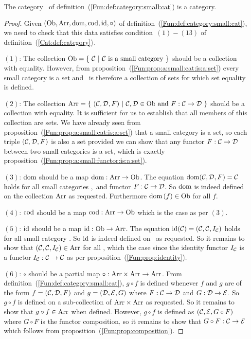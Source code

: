\begin{prop}\label{Fun:prop:category:small:cat}
    The category \cat\ of definition~(\ref{Fun:def:category:small:cat}) is 
    a category.
\end{prop}
\begin{proof}
    Given $(\mbox{\rm Ob}, \mbox{\rm Arr}, \mbox{\rm dom}, \mbox{\rm cod}, \mbox{\rm id}, \circ)$ of
    definition~(\ref{Fun:def:category:small:cat}), we need to check that this
    data satisfies condition~$(1)-(13)$ of definition~(\ref{Cat:def:category}).

    $(1)$: The collection $\ob=\{\ \Cat\ |\ \mbox{\Cat\ is a small category}\ \}$
    should be a collection with equality. However, from
    proposition~(\ref{Fun:prop:a:small:cat:is:a:set}) every small category is 
    a set and \ob\ is therefore a collection of sets for which set equality 
    is defined.
    
    $(2)$: The collection $\arr =\{\ (\Cat,\Dat,F)\ |\ \Cat,\Dat\in\ob\  
    \mbox{and}\ F:\Cat\to\Dat\ \}$ should be a collection with equality.
    It is sufficient for us to establish that all members of this collection
    are sets. We have already seen from 
    proposition~(\ref{Fun:prop:a:small:cat:is:a:set}) that a small category 
    is a set, so each triple $(\mbox{$\cal C$},\mbox{$\cal D$},F)$ is also a set provided we can 
    show that any functor $F:\mbox{$\cal C$}\to\mbox{$\cal D$}$ between two small categories is a 
    set, which is exactly proposition~(\ref{Fun:prop:a:small:functor:is:a:set}).
    
    $(3)$: $\mbox{\rm dom}$ should be a map $\mbox{\rm dom}:\mbox{\rm Arr}\to\mbox{\rm Ob}$. The equation
    $\mbox{\rm dom}(\mbox{$\cal C$},\mbox{$\cal D$},F)=\mbox{$\cal C$}$ holds for all small categories \Cat,\Dat\ and 
    functor $F:\mbox{$\cal C$}\to\mbox{$\cal D$}$. So $\mbox{\rm dom}$ is indeed defined on the collection
    $\mbox{\rm Arr}$ as requested. Furthermore $\mbox{\rm dom}\,(f)\in\mbox{\rm Ob}$ for all $f$.

    $(4)$: $\mbox{\rm cod}$ should be a map $\mbox{\rm cod}:\mbox{\rm Arr}\to\mbox{\rm Ob}$ which is the case 
    as per $(3)$.

    $(5)$: $\mbox{\rm id}$ should be a map $\mbox{\rm id}:\mbox{\rm Ob}\to\mbox{\rm Arr}$. The equation $\mbox{\rm id}(\mbox{$\cal C$})
    =(\mbox{$\cal C$},\mbox{$\cal C$},I_{\cal C})$ holds for all small category \Cat. So $\mbox{\rm id}$
    is indeed defined on \ob\ as requested. So it remains to show that
    $(\mbox{$\cal C$},\mbox{$\cal C$},I_{\cal C})\in\mbox{\rm Arr}$ for all \Cat, which the case since
    the identity functor $I_{\cal C}$ is a functor $I_{\cal C}:\mbox{$\cal C$}\to\mbox{$\cal C$}$ as 
    per proposition~(\ref{Fun:prop:identity}).

    $(6)$: $\circ$ should be a partial map $\circ:\mbox{\rm Arr}\times\mbox{\rm Arr}\to\mbox{\rm Arr}$.
    From definition~(\ref{Fun:def:category:small:cat}), $g\circ f$ is defined
    whenever $f$ and $g$ are of the form $f=(\mbox{$\cal C$},\mbox{$\cal D$},F)$ and $g=(\mbox{$\cal D$},\mbox{$\cal E$},G)$
    where $F:\mbox{$\cal C$}\to\mbox{$\cal D$}$ and $G:\mbox{$\cal D$}\to\mbox{$\cal E$}$. So $g\circ f$ is defined on
    a sub-collection of $\mbox{\rm Arr}\times\mbox{\rm Arr}$ as requested. So it remains to 
    show that $g\circ f\in\mbox{\rm Arr}$ when defined. However, $g\circ f$ is defined
    as $(\mbox{$\cal C$},\mbox{$\cal E$},G \circ F)$ where $G\circ F$ is the functor composition,
    so it remains to show that $G\circ F:\mbox{$\cal C$}\to\mbox{$\cal E$}$ which follows from
    proposition~(\ref{Fun:prop:composition}).


\end{proof}

